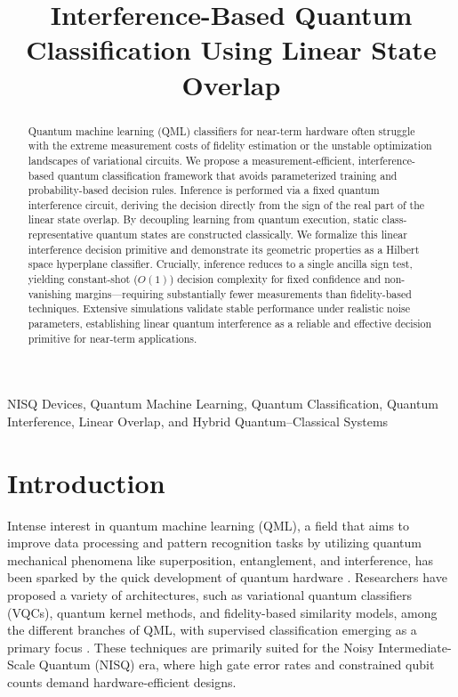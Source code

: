 \documentclass[conference]{IEEEtran}
\title{Interference-Based Quantum Classification Using Linear State Overlap}
\author{
\IEEEauthorblockN{
Tarakeshwaran S\IEEEauthorrefmark{1},
Srivaishnav S\IEEEauthorrefmark{1},
Pranesh S\IEEEauthorrefmark{1}
}
\IEEEauthorblockA{\IEEEauthorrefmark{1}
Department of Computer Science and Engineering\\
Velammal Engineering College, Chennai, India\\
tarakeshwaran.sampath@gmail.com\\
vaishnav90100@gmail.com\\
praneshjd2004@gmail.com
}
}
\begin{document}
\maketitle

\begin{abstract}
Quantum machine learning (QML) classifiers for near-term hardware often struggle with the extreme measurement costs of fidelity estimation or the unstable optimization landscapes of variational circuits. We propose a measurement-efficient, interference-based quantum classification framework that avoids parameterized training and probability-based decision rules. Inference is performed via a fixed quantum interference circuit, deriving the decision directly from the sign of the real part of the linear state overlap. By decoupling learning from quantum execution, static class-representative quantum states are constructed classically. We formalize this linear interference decision primitive and demonstrate its geometric properties as a Hilbert space hyperplane classifier. Crucially, inference reduces to a single ancilla sign test, yielding constant-shot ($O(1)$) decision complexity for fixed confidence and non-vanishing margins—requiring substantially fewer measurements than fidelity-based techniques. Extensive simulations validate stable performance under realistic noise parameters, establishing linear quantum interference as a reliable and effective decision primitive for near-term applications.
\end{abstract}

\begin{IEEEkeywords}
NISQ Devices, Quantum Machine Learning, Quantum Classification, Quantum Interference, Linear Overlap, and Hybrid Quantum--Classical Systems
\end{IEEEkeywords}

\section{Introduction}

Intense interest in quantum machine learning (QML), a field that aims to improve data processing and pattern recognition tasks by utilizing quantum mechanical phenomena like superposition, entanglement, and interference, has been sparked by the quick development of quantum hardware \cite{wang2024review,cerezo2021variational}. Researchers have proposed a variety of architectures, such as variational quantum classifiers (VQCs), quantum kernel methods, and fidelity-based similarity models, among the different branches of QML, with supervised classification emerging as a primary focus \cite{benedetti2019parameterized,abbas2021power,schuld2019feature}. These techniques are primarily suited for the Noisy Intermediate-Scale Quantum (NISQ) era, where high gate error rates and constrained qubit counts demand hardware-efficient designs.
\end{document}
